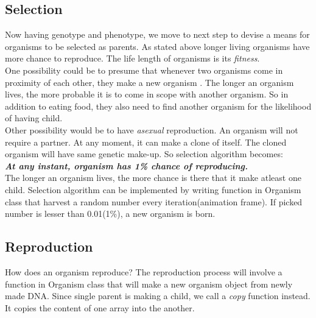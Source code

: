 \documentclass[conference]{IEEEtran}
\begin{document}
\subsection{Selection}
Now having genotype and phenotype, we move to next step to devise a means for organisms to be selected as parents. As stated above longer living organisms have more chance to reproduce. The life length of organisms is its \textit{fitness}.\\
One possibility could be to presume that whenever two organisms come in proximity of each other, they make a new organism \cite{improving-neuroevolution}. The longer an organism lives, the more probable it is to come in scope with another organism. So in addition to eating food, they also need to find another organism for the likelihood of having child.\\
Other possibility would be to have \textit{asexual} reproduction. An organism will not require a partner. At any moment, it can make a clone of itself. The cloned organism will have same genetic make-up. So selection algorithm becomes:\\
\textbf{\textit{At any instant, organism has 1\% chance of reproducing.}}\\
The longer an organism lives, the more chance is there that it make atleast one child. Selection algorithm can be implemented by writing function in Organism class that harvest a random number every iteration(animation frame). If picked number is lesser than 0.01(1\%), a new organism is born.
\subsection{Reproduction}
How does an organism reproduce? The reproduction process will involve a function in Organism class that will make a new organism object from newly made DNA. Since single parent is making a child, we call a \textit{copy} function instead. It copies the content of one array into the another.
\end{document}
